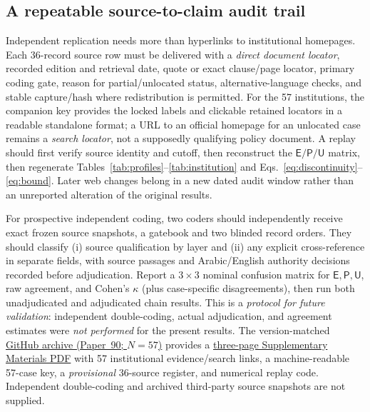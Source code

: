 \documentclass[conference,letterpaper]{IEEEtran}
\newcommand{\stE}{\textsf{E}}
\newcommand{\stP}{\textsf{P}}
\newcommand{\stU}{\textsf{U}}
\begin{document}
\subsection{A repeatable source-to-claim audit trail}
Independent replication needs more than hyperlinks to institutional homepages. Each 36-record source row must be delivered with a \emph{direct document locator}, recorded edition and retrieval date, quote or exact clause/page locator, primary coding gate, reason for partial/unlocated status, alternative-language checks, and stable capture/hash where redistribution is permitted. For the 57 institutions, the companion key provides the locked labels and clickable retained locators in a readable standalone format; a URL to an official homepage for an unlocated case remains a \emph{search locator}, not a supposedly qualifying policy document. A replay should first verify source identity and cutoff, then reconstruct the $\stE/\stP/\stU$ matrix, then regenerate Tables~\ref{tab:profiles}--\ref{tab:institution} and Eqs.~\eqref{eq:discontinuity}--\eqref{eq:bound}. Later web changes belong in a new dated audit window rather than an unreported alteration of the original results.

For prospective independent coding, two coders should independently receive exact frozen source snapshots, a gatebook and two blinded record orders. They should classify (i) source qualification by layer and (ii) any explicit cross-reference in separate fields, with source passages and Arabic/English authority decisions recorded before adjudication. Report a $3\!\times\!3$ nominal confusion matrix for $\stE,\stP,\stU$, raw agreement, and Cohen's $\kappa$ (plus case-specific disagreements), then run both unadjudicated and adjudicated chain results. This is a \emph{protocol for future validation}: independent double-coding, actual adjudication, and agreement estimates were \emph{not performed} for the present results. The version-matched \href{https://github.com/shaikhamalkawi-ux/From-AI-Strategy-to-University-Rules-in-the-GCC/tree/main/ICAMAC2026_Paper90_R2_57}{GitHub archive (Paper~90; $N=57$)} provides a \href{https://github.com/shaikhamalkawi-ux/From-AI-Strategy-to-University-Rules-in-the-GCC/blob/main/ICAMAC2026_Paper90_R2_57/supplement/ICAMAC2026_Paper90_57_Institutions_Supplement.pdf}{three-page Supplementary Materials PDF} with 57 institutional evidence/search links, a machine-readable 57-case key, a \emph{provisional} 36-source register, and numerical replay code. Independent double-coding and archived third-party source snapshots are not supplied.
\end{document}
